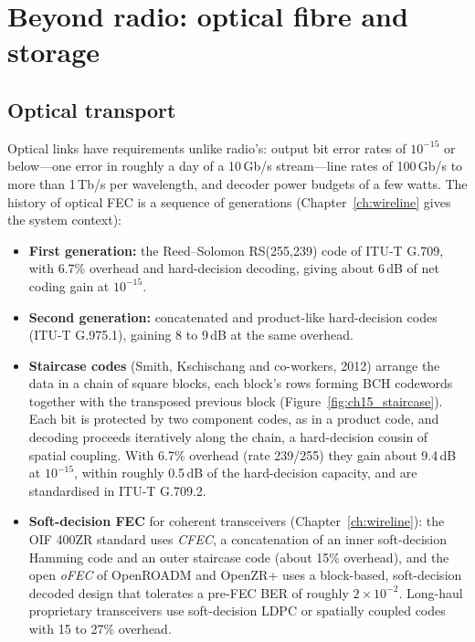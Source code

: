 \section{Beyond radio: optical fibre and storage}
\label{sec:ch15:optics}

\subsection{Optical transport}

Optical links have requirements unlike radio's: output bit error rates of $10^{-15}$ or below---one
error in roughly a day of a 10\,Gb/s stream---line rates of 100\,Gb/s to more than 1\,Tb/s per
wavelength, and decoder power budgets of a few watts. The history of optical FEC is a sequence of
generations (Chapter~\ref{ch:wireline} gives the system context):
\begin{itemize}
\item \textbf{First generation:} the Reed--Solomon RS(255,239) code of ITU-T G.709, with 6.7\%
overhead and hard-decision decoding, giving about 6\,dB of net coding gain at $10^{-15}$.
\item \textbf{Second generation:} concatenated and product-like hard-decision codes (ITU-T G.975.1),
gaining 8 to 9\,dB at the same overhead.
\item \textbf{Staircase codes} (Smith, Kschischang and co-workers, 2012) arrange the data in a chain
of square blocks, each block's rows forming BCH codewords together with the transposed previous
block (Figure~\ref{fig:ch15_staircase}). Each bit is protected by two component codes, as in a
product code, and decoding proceeds iteratively along the chain, a hard-decision cousin of spatial
coupling. With 6.7\% overhead (rate 239/255) they gain about 9.4\,dB at $10^{-15}$, within roughly
0.5\,dB of the hard-decision capacity, and are standardised in ITU-T G.709.2.
\item \textbf{Soft-decision FEC} for coherent transceivers (Chapter~\ref{ch:wireline}): the OIF 400ZR
standard uses \emph{CFEC}, a concatenation of an inner soft-decision Hamming code and an outer
staircase code (about 15\% overhead), and the open \emph{oFEC} of OpenROADM and OpenZR+ uses a
block-based, soft-decision decoded design that tolerates a pre-FEC BER of roughly $2\times10^{-2}$.
Long-haul proprietary transceivers use soft-decision LDPC or spatially coupled codes with 15 to 27\%
overhead.
\end{itemize}

